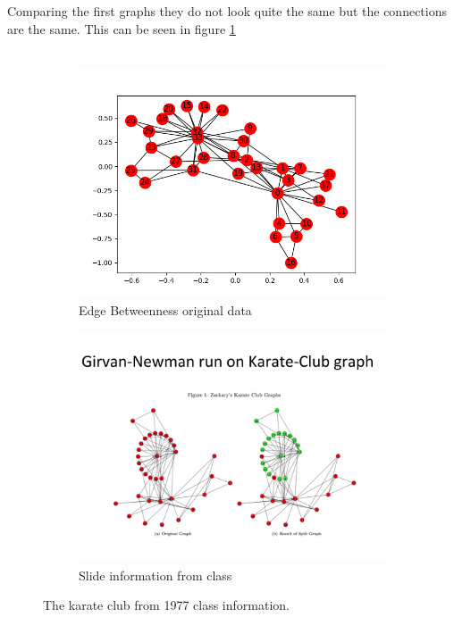 \documentclass[10pt,letterpaper]{article}
\begin{document}
Comparing the first graphs they do not look quite the same but the connections are the same.  This can be seen in figure \ref{fig:comp1}\\
\\
\begin{figure}[H]
  \centering
  \begin{subfigure}[b]{0.4\linewidth}
     \includegraphics[width=\linewidth]{karate00.png}
     \caption{Edge Betweenness original data}
  \end{subfigure}
  \begin{subfigure}[b]{0.4\linewidth}
     \includegraphics[width=\linewidth]{slide98.png} 
     \caption{Slide information from class}
  \end{subfigure}
  \caption{The karate club from 1977 class information.}
  \label{fig:comp1}
\end{figure}
\end{document}
